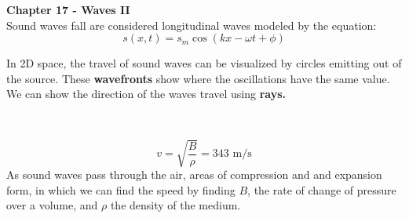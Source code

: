 \documentclass[11pt]{article}
\begin{document}
    \noindent \textbf{Chapter 17 - Waves II}
    \\ \noindent \newline Sound waves fall are considered longitudinal waves modeled by the equation:
    \begin{equation}
        s(x,t) = s_m\cos(kx - \omega t + \phi) \tag{sound equation}
    \end{equation}


    \noindent In 2D space, the travel of sound waves can be visualized by circles
    emitting out of the source.
    These \textbf{wavefronts} show where the oscillations have the same value.
    We can show the direction of the waves travel using \textbf{rays.}

    \\ \hfill
    \begin{minipage}[b]{0.3\textwidth}
    \end{minipage}
    \hfill
    \begin{minipage}[b] {0.6\textwidth}
        \begin{equation}
            v = \sqrt{\frac{B}{\rho}} = 343 \text{ m/s} \tag{speed of sound in air}\label{eq:soundSpeed}
        \end{equation}
        As sound waves pass through the air, areas of compression and and expansion form,
        in which we can find the speed by finding $B$, the rate of change of pressure over a volume,
        and $\rho$ the density of the medium.
    \end{minipage}
\end{document}
